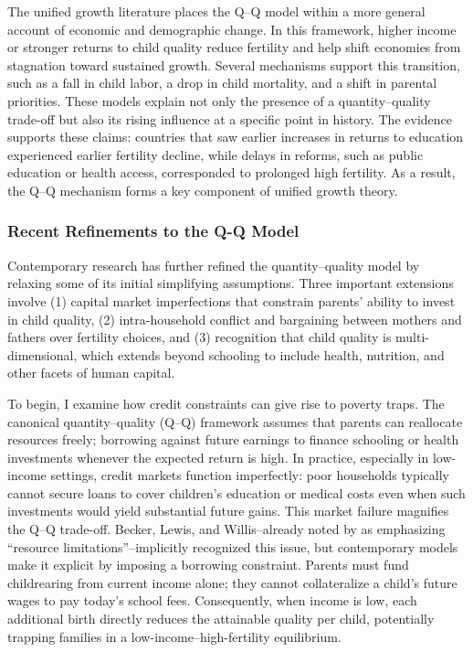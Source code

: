 \documentclass[]{AEA}
\begin{document}
The unified growth literature places the Q--Q model within a more
general account of economic and demographic change. In this framework,
higher income or stronger returns to child quality reduce fertility and
help shift economies from stagnation toward sustained growth. Several
mechanisms support this transition, such as a fall in child labor, a
drop in child mortality, and a shift in parental priorities. These
models explain not only the presence of a quantity--quality trade-off
but also its rising influence at a specific point in history. The
evidence supports these claims: countries that saw earlier increases in
returns to education experienced earlier fertility decline, while delays
in reforms, such as public education or health access, corresponded to
prolonged high fertility. As a result, the Q--Q mechanism forms a key
component of unified growth theory.

\subsubsection{Recent Refinements to the Q-Q Model}

Contemporary research has further refined the quantity--quality model by
relaxing some of its initial simplifying assumptions. Three important
extensions involve (1) capital market imperfections that constrain
parents' ability to invest in child quality, (2) intra-household
conflict and bargaining between mothers and fathers over fertility
choices, and (3) recognition that child quality is multi-dimensional,
which extends beyond schooling to include health, nutrition, and other
facets of human capital.

To begin, I examine how credit constraints can give rise to poverty
traps. The canonical quantity--quality (Q--Q) framework assumes that
parents can reallocate resources freely; borrowing against future
earnings to finance schooling or health investments whenever the
expected return is high. In practice, especially in low-income settings,
credit markets function imperfectly: poor households typically cannot
secure loans to cover children's education or medical costs even when
such investments would yield substantial future gains. This market
failure magnifies the Q--Q trade-off. Becker, Lewis, and Willis--already
noted by \citet{grawe2008quality} as emphasizing ``resource
limitations''--implicitly recognized this issue, but contemporary models
make it explicit by imposing a borrowing constraint. Parents must fund
childrearing from current income alone; they cannot collateralize a
child's future wages to pay today's school fees. Consequently, when
income is low, each additional birth directly reduces the attainable
quality per child, potentially trapping families in a
low-income--high-fertility equilibrium.
\end{document}
